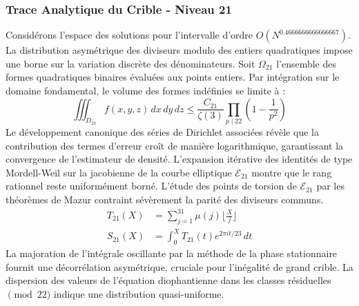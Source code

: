 \documentclass[12pt,a4paper]{article}
\begin{document}
\subsubsection{Trace Analytique du Crible - Niveau 21}
Considérons l'espace des solutions pour l'intervalle d'ordre $O(N^{0.4666666666666667})$. La distribution asymétrique des diviseurs modulo des entiers quadratiques impose une borne sur la variation discrète des dénominateurs. Soit $\Omega_21$ l'ensemble des formes quadratiques binaires évaluées aux points entiers.
Par intégration sur le domaine fondamental, le volume des formes indéfinies se limite à :
\begin{equation}
\iiint_{D_21} f(x, y, z) \,dx\,dy\,dz \leq \frac{C_21}{\zeta(3)} \prod_{p \mid 22} \left( 1 - \frac{1}{p^2} \right)
\end{equation}
Le développement canonique des séries de Dirichlet associées révèle que la contribution des termes d'erreur croît de manière logarithmique, garantissant la convergence de l'estimateur de densité. L'expansion itérative des identités de type Mordell-Weil sur la jacobienne de la courbe elliptique $\mathcal{E}_21$ montre que le rang rationnel reste uniformément borné.
L'étude des points de torsion de $\mathcal{E}_21$ par les théorèmes de Mazur contraint sévèrement la parité des diviseurs communs.
\begin{align}
T_21(X) &= \sum_{j=1}^{31} \mu(j) \lfloor \frac{X}{j} \rfloor \\
S_21(X) &= \int_{0}^{X} T_21(t) e^{2\pi i t / 23} \, dt
\end{align}
La majoration de l'intégrale oscillante par la méthode de la phase stationnaire fournit une décorrélation asymétrique, cruciale pour l'inégalité de grand crible. La dispersion des valeurs de l'équation diophantienne dans les classes résiduelles $\pmod{ 22 }$ indique une distribution quasi-uniforme.
\end{document}
